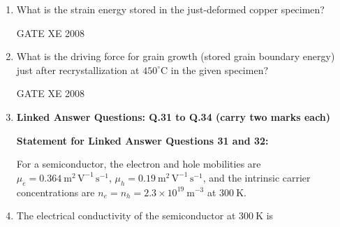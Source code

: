 \documentclass[12pt]{article}
\begin{document}
\begin{enumerate}[label=Q\arabic*.]
\item What is the strain energy stored in the just-deformed copper specimen?

\begin{enumerate}[label=(\Alph*)]
\end{enumerate}

GATE XE 2008

\item What is the driving force for grain growth (stored grain boundary energy) just after recrystallization at $450^\circ \mathrm{C}$ in the given specimen?

\begin{enumerate}[label=(\Alph*)]
\end{enumerate}

GATE XE 2008

\item[]\textbf{\Large Linked Answer Questions: Q.31 to Q.34 (carry two marks each)} 

\textbf{Statement for Linked Answer Questions 31 and 32:} 

    For a semiconductor, the electron and hole mobilities are $\mu_e = 0.364 \ \mathrm{m^2 \, V^{-1} \, s^{-1}}$, $\mu_h = 0.19 \ \mathrm{m^2 \, V^{-1} \, s^{-1}}$, and the intrinsic carrier concentrations are $n_e = n_h = 2.3 \times 10^{19} \ \mathrm{m^{-3}}$ at $300 \ \mathrm{K}$.

\item The electrical conductivity of the semiconductor at $300 \ \mathrm{K}$ is

\begin{enumerate}[label=(\Alph*)]
\end{enumerate}


\end{enumerate}
\end{document}
